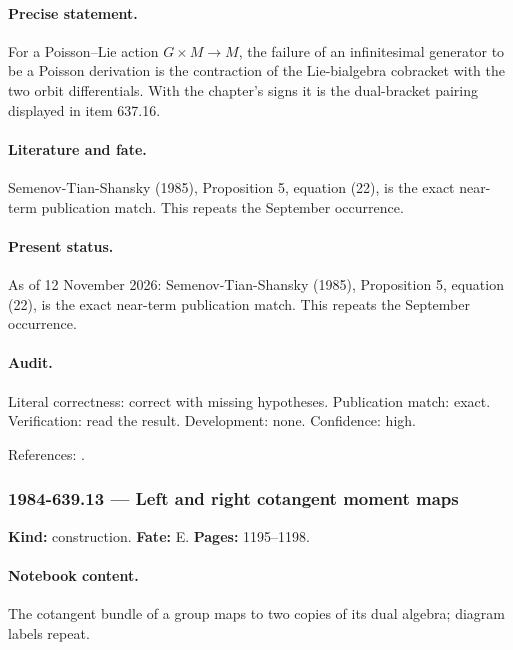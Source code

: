 \paragraph{Precise statement.} For a Poisson--Lie action \(G\times M\to M\), the failure of an infinitesimal generator to be a Poisson derivation is the contraction of the Lie-bialgebra cobracket with the two orbit differentials. With the chapter's signs it is the dual-bracket pairing displayed in item 637.16.

\paragraph{Literature and fate.} Semenov-Tian-Shansky (1985), Proposition 5, equation (22), is the exact near-term publication match. This repeats the September occurrence.

\paragraph{Present status.} As of 12 November 2026: Semenov-Tian-Shansky (1985), Proposition 5, equation (22), is the exact near-term publication match. This repeats the September occurrence.

\paragraph{Audit.} Literal correctness: correct with missing hypotheses. Publication match: exact. Verification: read the result. Development: none. Confidence: high.

\noindent References: \citep{semenov1985dressing}.\par

\subsubsection{1984-639.13 --- Left and right cotangent moment maps}

\label{item:1984-639.13}

\noindent\textbf{Kind:} construction. \textbf{Fate:} E. \textbf{Pages:} 1195--1198.\par

\paragraph{Notebook content.} The cotangent bundle of a group maps to two copies of its dual algebra; diagram labels repeat.

